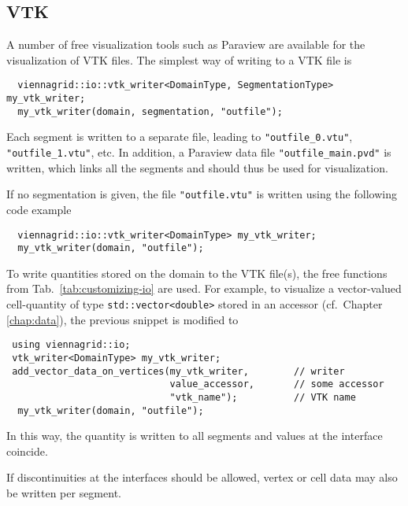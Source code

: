 
 \subsection{VTK}
 A number of free visualization tools such as Paraview \cite{paraview} are available for the visualization of VTK files.
 The simplest way of writing to a VTK file is 
 \begin{lstlisting}
  viennagrid::io::vtk_writer<DomainType, SegmentationType> my_vtk_writer;
  my_vtk_writer(domain, segmentation, "outfile");
 \end{lstlisting}
 Each segment is written to a separate file, leading to \lstinline|"outfile_0.vtu"|, \lstinline|"outfile_1.vtu"|, etc. In addition,
 a Paraview data file \lstinline|"outfile_main.pvd"| is written, which links all the segments and should thus be used for visualization.
 
 If no segmentation is given, the file \lstinline|"outfile.vtu"| is written using the following code example
 \begin{lstlisting}
  viennagrid::io::vtk_writer<DomainType> my_vtk_writer;
  my_vtk_writer(domain, "outfile");
 \end{lstlisting}

 To write quantities stored on the domain to the VTK file(s), the free functions from Tab.~\ref{tab:customizing-io} are used.
 For example, to visualize a vector-valued cell-quantity of type \lstinline|std::vector<double>| stored in an accessor (cf.~Chapter \ref{chap:data}), the previous snippet is modified to
 \begin{lstlisting}
 using viennagrid::io;
 vtk_writer<DomainType> my_vtk_writer;
 add_vector_data_on_vertices(my_vtk_writer,        // writer
                             value_accessor,       // some accessor
                             "vtk_name");          // VTK name
  my_vtk_writer(domain, "outfile");
 \end{lstlisting}
 In this way, the quantity is written to all segments and values at the interface coincide.

 If discontinuities at the interfaces should be allowed, vertex or cell data may also be written per segment.
 
